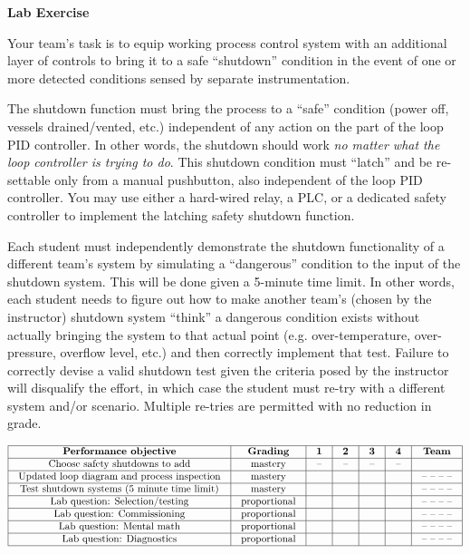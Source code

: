 \noindent
{\bf Lab Exercise}

\vskip 5pt

Your team's task is to equip working process control system with an additional layer of controls to bring it to a safe ``shutdown'' condition in the event of one or more detected conditions sensed by separate instrumentation.

The shutdown function must bring the process to a ``safe'' condition (power off, vessels drained/vented, etc.) independent of any action on the part of the loop PID controller.  In other words, the shutdown should work {\it no matter what the loop controller is trying to do}.  This shutdown condition must ``latch'' and be re-settable only from a manual pushbutton, also independent of the loop PID controller.  You may use either a hard-wired relay, a PLC, or a dedicated safety controller to implement the latching safety shutdown function.

Each student must independently demonstrate the shutdown functionality of a different team's system by simulating a ``dangerous'' condition to the input of the shutdown system.  This will be done given a 5-minute time limit.  In other words, each student needs to figure out how to make another team's (chosen by the instructor) shutdown system ``think'' a dangerous condition exists without actually bringing the system to that actual point (e.g. over-temperature, over-pressure, overflow level, etc.) and then correctly implement that test.  Failure to correctly devise a valid shutdown test given the criteria posed by the instructor will disqualify the effort, in which case the student must re-try with a different system and/or scenario.  Multiple re-tries are permitted with no reduction in grade.

\vskip 10pt



$$\vbox{\offinterlineskip
\halign{\strut
\vrule \quad\hfil # \ \hfil & 
\vrule \quad\hfil # \ \hfil & 
\vrule \quad\hfil # \ \hfil & 
\vrule \quad\hfil # \ \hfil & 
\vrule \quad\hfil # \ \hfil & 
\vrule \quad\hfil # \ \hfil & 
\vrule \quad\hfil # \ \hfil \vrule \cr
\noalign{\hrule}
%
{\bf Performance objective} & {\bf Grading} & {\bf 1} & {\bf 2} & {\bf 3} & {\bf 4} & {\bf Team} \cr
%
\noalign{\hrule}
%
Choose safety shutdowns to add & mastery & -- & -- & -- & -- & \cr
%
\noalign{\hrule}
%
Updated loop diagram and process inspection & mastery & & & & & -- -- -- -- \cr
%
\noalign{\hrule}
%
Test shutdown systems (5 minute time limit) & mastery & & & & & -- -- -- -- \cr
%
\noalign{\hrule}
%
Lab question: Selection/testing & proportional &  &  &  &  & -- -- -- -- \cr
%
\noalign{\hrule}
%
Lab question: Commissioning & proportional &  &  &  &  & -- -- -- -- \cr
%
\noalign{\hrule}
%
Lab question: Mental math & proportional &  &  &  &  & -- -- -- -- \cr
%
\noalign{\hrule}
%
Lab question: Diagnostics & proportional &  &  &  &  & -- -- -- -- \cr
%
\noalign{\hrule}
} %
}$$ %


